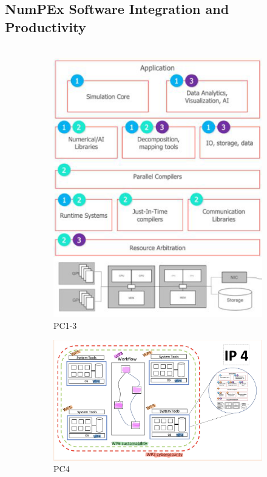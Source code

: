 \subsection{NumPEx Software Integration and Productivity}
\begin{frame}
  \frametitle{\insertsectionhead}
  \framesubtitle{\insertsubsectionhead}

  \begin{columns}[t]
    \begin{column}{.5\textwidth}
       \begin{figure}[ht]%
         \centering
          \begin{subfigure}{.45\textwidth}\centering
            \includegraphics[height=0.5\textwidth]{../figures/numpex-ip123.png}
            \caption{PC1-3}
          \end{subfigure}          
          \begin{subfigure}{.5\textwidth}\centering
            \includegraphics[width=.9\textwidth]{../figures/numpex-ip4.png}
            \caption{PC4}
          \end{subfigure}
          \newline
           \begin{subfigure}{.9\textwidth}\centering

\end{subfigure}
\end{figure}
\end{column}
\end{columns}
\end{frame}
